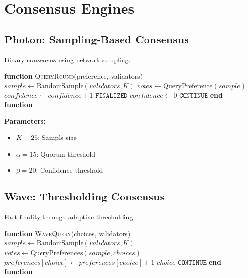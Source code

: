 \documentclass[11pt]{article}
\begin{document}
\section{Consensus Engines}

\subsection{Photon: Sampling-Based Consensus}

Binary consensus using network sampling:



\begin{algorithmic}[1]
\State \textbf{function} \textsc{QueryRound}(preference, validators)
    \State $sample \gets \text{RandomSample}(validators, K)$
    \State $votes \gets \text{QueryPreference}(sample)$
        \State $confidence \gets confidence + 1$
            \State \Return $\texttt{FINALIZED}$
        \EndIf
    \Else
        \State $confidence \gets 0$
    \EndIf
    \State \Return $\texttt{CONTINUE}$
\State \textbf{end function}
\end{algorithmic}


\textbf{Parameters:}
\begin{itemize}
\item $K = 25$: Sample size
\item $\alpha = 15$: Quorum threshold
\item $\beta = 20$: Confidence threshold
\end{itemize}

\subsection{Wave: Thresholding Consensus}

Fast finality through adaptive thresholding:



\begin{algorithmic}[1]
\State \textbf{function} \textsc{WaveQuery}(choices, validators)
    \State $sample \gets \text{RandomSample}(validators, K)$
    \State $votes \gets \text{QueryPreferences}(sample, choices)$
            \State $preferences[choice] \gets preferences[choice] + 1$
                \State \Return $choice$ 
            \EndIf
        \EndIf
    \EndFor
    \State \Return $\texttt{CONTINUE}$
\State \textbf{end function}
\end{algorithmic}
\end{document}
